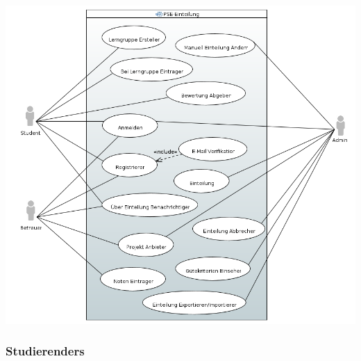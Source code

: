 \documentclass[parskip=full]{scrartcl}
\begin{document}
\includegraphics[width=\linewidth]{diagramme_pflichtenheft/UseCase_Diagram.PNG}

\subsubsection{\glspl{Studierender}}
\end{document}
